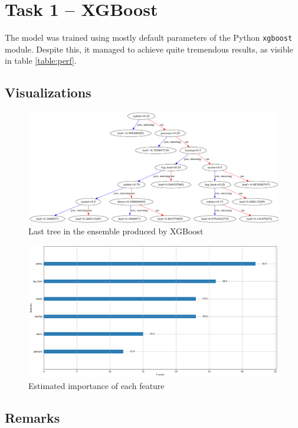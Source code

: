 \documentclass[../main.tex]{subfiles}
\begin{document}
\section{Task 1 -- XGBoost}
The model was trained using mostly default parameters of the Python
\verb`xgboost` module. Despite this, it managed to achieve quite tremendous
results, as visible in table \ref{table:perf}.

\subsection{Visualizations}
\begin{figure}[H]
    \centering
    \includegraphics[width=\linewidth]{../img/xgb-tree.png}
    \caption{Last tree in the ensemble produced by XGBoost}
    \label{fig:xgb-tree}
\end{figure}
\begin{figure}[H]
    \centering
    \includegraphics[width=\linewidth]{../img/xgb-feature-importance.png}
    \caption{Estimated importance of each feature}
    \label{fig:xgb-feats}
\end{figure}

\subsection{Remarks}
\end{document}
